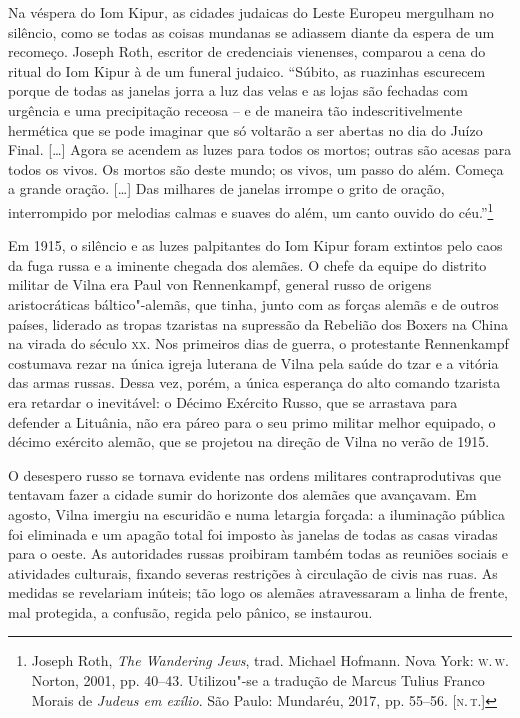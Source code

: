 Na véspera do Iom Kipur, as cidades judaicas do Leste Europeu mergulham
no silêncio, como se todas as coisas mundanas se adiassem diante da
espera de um recomeço. Joseph Roth, escritor de credenciais vienenses,
comparou a cena do ritual do Iom Kipur à de um funeral judaico.
``Súbito, as ruazinhas escurecem porque de todas as janelas jorra a luz
das velas e as lojas são fechadas com urgência e uma precipitação
receosa -- e de maneira tão indescritivelmente hermética que se pode
imaginar que só voltarão a ser abertas no dia do Juízo Final.
{[}\ldots{}{]} Agora se acendem as luzes para todos os mortos; outras
são acesas para todos os vivos. Os mortos são deste mundo; os vivos, um
passo do além. Começa a grande oração. {[}\ldots{}{]} Das milhares de
janelas irrompe o grito de oração, interrompido por melodias calmas e
suaves do além, um canto ouvido do céu.''\footnote{Joseph Roth, \textit{The Wandering Jews}, trad. Michael Hofmann. Nova York: \textsc{w.\,w.}\,Norton, 2001, pp. 40--43. Utilizou"-se a tradução de Marcus Tulius Franco Morais de \textit{Judeus em exílio}. São Paulo: Mundaréu, 2017, pp. 55--56. [\textsc{n.\,t.}]}

Em 1915, o silêncio e as luzes palpitantes do Iom Kipur foram extintos
pelo caos da fuga russa e a iminente chegada dos alemães. O chefe da
equipe do distrito militar de Vilna era Paul von Rennenkampf, general
russo de origens aristocráticas báltico"-alemãs, que tinha, junto com as
forças alemãs e de outros países, liderado as tropas tzaristas na
supressão da Rebelião dos Boxers na China na virada do século \textsc{xx}. Nos
primeiros dias de guerra, o protestante Rennenkampf costumava rezar na
única igreja luterana de Vilna pela saúde do tzar e a vitória das armas
russas. Dessa vez, porém, a única esperança do alto comando tzarista era
retardar o inevitável: o Décimo Exército Russo, que se arrastava para
defender a Lituânia, não era páreo para o seu primo militar melhor
equipado, o décimo exército alemão, que se projetou na direção de Vilna
no verão de 1915.

O desespero russo se tornava evidente nas ordens militares
contraprodutivas que tentavam fazer a cidade sumir do horizonte dos
alemães que avançavam. Em agosto, Vilna imergiu na escuridão e numa
letargia forçada: a iluminação pública foi eliminada e um apagão total
foi imposto às janelas de todas as casas viradas para o oeste. As
autoridades russas proibiram também todas as reuniões sociais e
atividades culturais, fixando severas restrições à circulação de civis
nas ruas. As medidas se revelariam inúteis; tão logo os alemães
atravessaram a linha de frente, mal protegida, a confusão, regida pelo
pânico, se instaurou.

